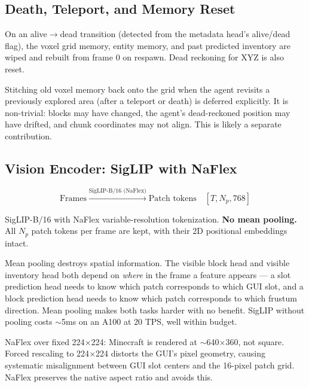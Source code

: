 \documentclass[11pt,a4paper]{article}
\begin{document}
\subsection{Death, Teleport, and Memory Reset}

On an alive$\to$dead transition (detected from the metadata head's alive/dead flag), the voxel grid memory, entity memory, and past predicted inventory are wiped and rebuilt from frame 0 on respawn. Dead reckoning for XYZ is also reset.

\begin{designdecision}
Stitching old voxel memory back onto the grid when the agent revisits a previously explored area (after a teleport or death) is deferred explicitly. It is non-trivial: blocks may have changed, the agent's dead-reckoned position may have drifted, and chunk coordinates may not align. This is likely a separate contribution.
\end{designdecision}

\subsection{Vision Encoder: SigLIP with NaFlex}

\[
\text{Frames} \xrightarrow{\text{SigLIP-B/16 (NaFlex)}} \text{Patch tokens} \quad [T, N_p, 768]
\]

SigLIP-B/16 with NaFlex variable-resolution tokenization. \textbf{No mean pooling.} All $N_p$ patch tokens per frame are kept, with their 2D positional embeddings intact.

\begin{designdecision}
Mean pooling destroys spatial information. The visible block head and visible inventory head both depend on \textit{where} in the frame a feature appears --- a slot prediction head needs to know which patch corresponds to which GUI slot, and a block prediction head needs to know which patch corresponds to which frustum direction. Mean pooling makes both tasks harder with no benefit. SigLIP without pooling costs $\sim$5ms on an A100 at 20 TPS, well within budget.
\end{designdecision}

\begin{designdecision}
NaFlex over fixed 224$\times$224: Minecraft is rendered at $\sim$640$\times$360, not square. Forced rescaling to 224$\times$224 distorts the GUI's pixel geometry, causing systematic misalignment between GUI slot centers and the 16-pixel patch grid. NaFlex preserves the native aspect ratio and avoids this.
\end{designdecision}
\end{document}
